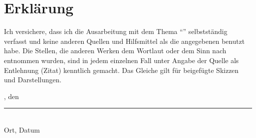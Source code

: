 \cleardoublepage%
\pagestyle{plain}

\chapter*{Erklärung}
    Ich versichere, dass ich die Ausarbeitung mit dem Thema \enquote{\Subject} selbstständig
    verfasst und keine anderen Quellen und Hilfsmittel als die angegebenen benutzt habe. Die
    Stellen, die anderen Werken dem Wortlaut oder dem Sinn nach entnommen wurden, sind in jedem
    einzelnen Fall unter Angabe der Quelle als Entlehnung (Zitat) kenntlich gemacht. Das Gleiche
    gilt für beigefügte Skizzen und Darstellungen.\\[4cm]
    \parbox{\textwidth}{%
        \parbox[b]{7cm}{%
            \Location, den \Deadline\\[-0.3cm]
            \rule{6cm}{1pt}\\
            Ort, Datum
        }
        \hfill%
        \parbox[b]{7cm}{%
            \Signature%
        }
    }
